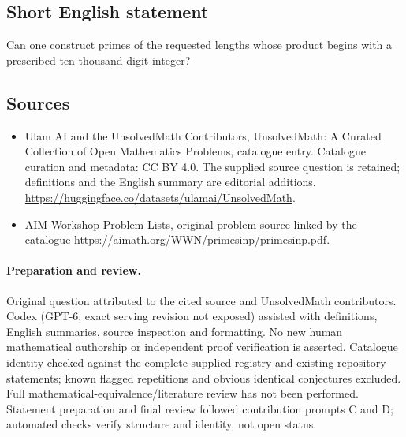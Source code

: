 \documentclass[11pt]{article}
\begin{document}
\subsection{Short English statement}
Can one construct primes of the requested lengths whose product begins with a prescribed ten-thousand-digit integer?
\subsection{Sources}
\begin{itemize}
\item[\hypertarget{source:statement:1}{S1}] Ulam AI and the UnsolvedMath Contributors, UnsolvedMath: A Curated Collection of Open Mathematics Problems, catalogue entry. Catalogue curation and metadata: CC BY 4.0. The supplied source question is retained; definitions and the English summary are editorial additions.
\url{https://huggingface.co/datasets/ulamai/UnsolvedMath}.
\item[\hypertarget{source:statement:2}{S2}] AIM Workshop Problem Lists, original problem source linked by the catalogue
\url{https://aimath.org/WWN/primesinp/primesinp.pdf}.
\end{itemize}
\paragraph{Preparation and review.}
Original question attributed to the cited source and UnsolvedMath contributors. Codex (GPT-6; exact serving revision not exposed) assisted with definitions, English summaries, source inspection and formatting. No new human mathematical authorship or independent proof verification is asserted. Catalogue identity checked against the complete supplied registry and existing repository statements; known flagged repetitions and obvious identical conjectures excluded. Full mathematical-equivalence/literature review has not been performed. Statement preparation and final review followed contribution prompts C and D; automated checks verify structure and identity, not open status.
\label{end:statement}
\end{document}
